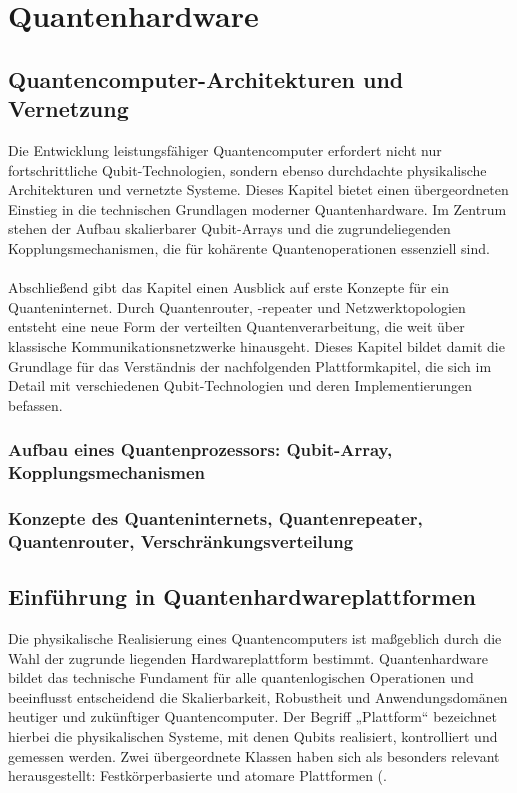 

\chapter{Quantenhardware}
\label{hardware} %



\section{Quantencomputer-Architekturen und Vernetzung}
Die Entwicklung leistungsfähiger Quantencomputer erfordert nicht nur fortschrittliche Qubit-Technologien, sondern ebenso durchdachte physikalische Architekturen und vernetzte Systeme. Dieses Kapitel bietet einen übergeordneten Einstieg in die technischen Grundlagen moderner Quantenhardware. Im Zentrum stehen der Aufbau skalierbarer Qubit-Arrays und die zugrundeliegenden Kopplungsmechanismen, die für kohärente Quantenoperationen essenziell sind.
\\\\
Abschließend gibt das Kapitel einen Ausblick auf erste Konzepte für ein Quanteninternet. Durch Quantenrouter, -repeater und Netzwerktopologien entsteht eine neue Form der verteilten Quantenverarbeitung, die weit über klassische Kommunikationsnetzwerke hinausgeht. Dieses Kapitel bildet damit die Grundlage für das Verständnis der nachfolgenden Plattformkapitel, die sich im Detail mit verschiedenen Qubit-Technologien und deren Implementierungen befassen.
\subsection{Aufbau eines Quantenprozessors: Qubit-Array, Kopplungsmechanismen}
\subsection{Konzepte des Quanteninternets, Quantenrepeater, Quantenrouter, Verschränkungsverteilung}

\section{Einführung in Quantenhardwareplattformen}
Die physikalische Realisierung eines Quantencomputers ist maßgeblich durch die Wahl der zugrunde liegenden Hardwareplattform bestimmt. Quantenhardware bildet das technische Fundament für alle quantenlogischen Operationen und beeinflusst entscheidend die Skalierbarkeit, Robustheit und Anwendungsdomänen heutiger und zukünftiger Quantencomputer. Der Begriff „Plattform“ bezeichnet hierbei die physikalischen Systeme, mit denen Qubits realisiert, kontrolliert und gemessen werden. Zwei übergeordnete Klassen haben sich als besonders relevant herausgestellt: Festkörperbasierte und atomare Plattformen (\cite{schmaltz_quantentechnologien_2025, homeister_quantum_2015}.

